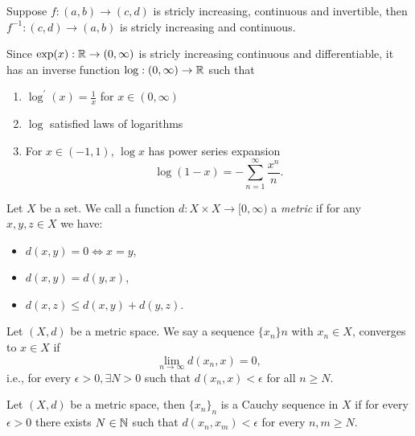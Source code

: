\documentclass[twoside]{article}
\begin{document}
\begin{theorem}
    Suppose $f : (a,b) \to (c,d)$ is stricly increasing, continuous and invertible,
    then $f^{-1}: (c,d) \to (a,b)$ is stricly increasing and continuous.
\end{theorem}

\begin{definition}
    Since $\exp(x) : \mathbb{R} \to (0, \infty)$ is stricly increasing continuous and differentiable,
    it has an inverse function $\log : (0, \infty) \to \mathbb{R}$ such that
    \begin{enumerate}
        \item $\log^{\prime}(x) = \frac{1}{x}$ for $x \in (0, \infty)$
        \item $\log$ satisfied laws of logarithms
        \item For $x \in (-1, 1)$, $\log x$ has power series expansion
            \begin{equation*}
                \log(1 - x) = -\sum_{n = 1}^{\infty} \frac{x^{n}}{n}.
            \end{equation*}
    \end{enumerate}
\end{definition}

\begin{definition}[Metric]
    Let $X$ be a set. We call a function $d: X \times X \to [0, \infty)$ a \textit{metric}
    if for any $x, y, z \in X$ we have:
    \begin{itemize}
        \item $d(x,y) = 0 \iff x = y$,
        \item $d(x,y) = d(y,x)$,
        \item $d(x,z) \leq d(x,y) + d(y, z)$.
    \end{itemize}
\end{definition}

\begin{theorem}
    Let $(X, d)$ be a metric space. We say a sequence $\{x_{n}\}n$ with $x_{n} \in X$,
    converges to $x \in X$ if 
    \begin{equation*}
        \lim_{n \to \infty}d(x_{n}, x) = 0,
    \end{equation*}
    i.e., for every $\epsilon > 0, \exists N>0$ such that $d(x_{n}, x) < \epsilon$
    for all $n \geq N$.
\end{theorem}

\begin{definition}
    Let $(X, d)$ be a metric space, then $\{x_{n}\}_{n}$ is a Cauchy sequence
    in $X$ if for every $\epsilon > 0$ there exists $N \in \mathbb{N}$ such that
    $d(x_{n}, x_{m}) < \epsilon$ for every $n, m \geq N$.
\end{definition}
\end{document}
